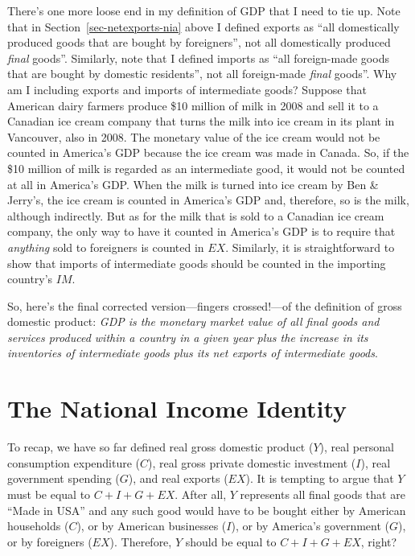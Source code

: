 \documentclass[
  letterpaper,
]{book}
\theoremstyle{plain}
\theoremstyle{remark}
\begin{document}
There's one more loose end in my definition of GDP that I need to tie
up. Note that in Section~\ref{sec-netexports-nia} above I defined
exports as ``all domestically produced goods that are bought by
foreigners'', not all domestically produced \emph{final} goods''.
Similarly, note that I defined imports as ``all foreign-made goods that
are bought by domestic residents'', not all foreign-made \emph{final}
goods''. Why am I including exports and imports of intermediate goods?
Suppose that American dairy farmers produce \$10 million of milk in 2008
and sell it to a Canadian ice cream company that turns the milk into ice
cream in its plant in Vancouver, also in 2008. The monetary value of the
ice cream would not be counted in America's GDP because the ice cream
was made in Canada. So, if the \$10 million of milk is regarded as an
intermediate good, it would not be counted at all in America's GDP. When
the milk is turned into ice cream by Ben \& Jerry's, the ice cream is
counted in America's GDP and, therefore, so is the milk, although
indirectly. But as for the milk that is sold to a Canadian ice cream
company, the only way to have it counted in America's GDP is to require
that \emph{anything} sold to foreigners is counted in \(EX\). Similarly,
it is straightforward to show that imports of intermediate goods should
be counted in the importing country's \(IM\).

So, here's the final corrected version---fingers crossed!---of the
definition of gross domestic product: \emph{GDP is the monetary market
value of all final goods and services produced within a country in a
given year plus the increase in its inventories of intermediate goods
plus its net exports of intermediate goods}.

\section{The National Income Identity}\label{sec-ni-identity}

To recap, we have so far defined real gross domestic product (\(Y\)),
real personal consumption expenditure (\(C\)), real gross private
domestic investment (\(I\)), real government spending (\(G\)), and real
exports (\(EX\)). It is tempting to argue that \(Y\) must be equal to
\(C+I+G+EX\). After all, \(Y\) represents all final goods that are
``Made in USA'' and any such good would have to be bought either by
American households (\(C\)), or by American businesses (\(I\)), or by
America's government (\(G\)), or by foreigners (\(EX\)). Therefore,
\(Y\) should be equal to \(C+I+G+EX\), right?
\end{document}
